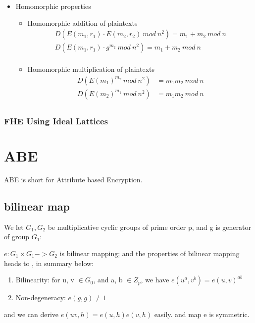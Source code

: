 \documentclass[a4paper,11pt]{article}
\begin{document}
\begin{itemize}
\item {Homomorphic properties}

\begin{itemize}
\item {Homomorphic addition of plaintexts}
\begin{equation}
\begin{split}
D(E(m_1, r_1) \cdot E(m_2, r_2)\ mod\ n^2) = m_1 + m_2\ mod\ n \\
D(E(m_1, r_1) \cdot g^{m_2}\ mod\ n^2) = m_1 + m_2\ mod\ n \\
\end{split}
\end{equation}
\item {Homomorphic multiplication of plaintexts}
\begin{equation}
\begin{split}
D(E(m_1)^{m_2}\ mod\ n^2) &= m_1 m_2\ mod\ n \\
D(E(m_2)^{m_1}\ mod\ n^2) &= m_1 m_2\ mod\ n \\
\end{split}
\end{equation}
\end{itemize}

\end{itemize}

\subsubsection{FHE Using Ideal Lattices}



\section{ABE}
ABE is short for  Attribute based Encryption.

\subsection{bilinear map} 
We  let $G_1, G_2$ be multiplicative cyclic groups of prime order p,  and g is generator of group $G_1$:

$e: G_1 \times G_1 -> G_2$ is bilinear mapping;  and the properties of bilinear mapping heads to  \cite{s1}, in summary below:

\begin{enumerate}
\item Bilinearity: for u, v $ \in G_0$, and a, b $\in Z_p$, we have $e(u^a, v^b) = e(u, v)^{ab}$
\item Non-degeneracy:  $e(g, g) \neq 1$
\end{enumerate}
and we can derive $ e(u  v, h) = e(u, h)  e(v, h)$ easily. and map e is symmetric.
\end{document}

